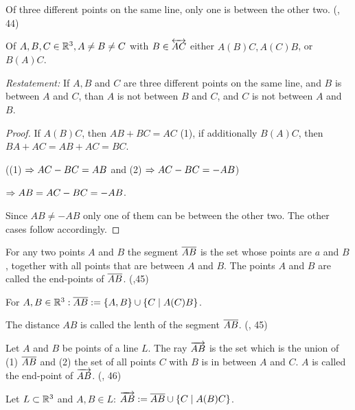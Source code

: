 \begin{theorem}[2-3.]\label{thm:2-3.}
  \leanok
  Of three different points on the same line, only one is between the other two.
  (\cite{SMSGGeometry}, 44)

  Of $A,B,C \in \mathbb{R}^3, A \ne B \ne C$ with $B \in \overleftrightarrow{AC}$ either $A(B)C, A(C)B$, or $B(A)C$.
\end{theorem}
\textit{Restatement:} If $A,B$ and $C$ are three different points on the same line, and $B$ is between $A$ and $C$, than $A$ is not between $B$ and $C$, and $C$ is not between $A$ and $B$.

\begin{proof}
  \leanok
  If $A(B)C$, then $AB+BC=AC$ (1), if additionally $B(A)C$, then $BA+AC=AB+AC=BC$.

  ((1) $\Rightarrow AC-BC=AB$ and (2) $\Rightarrow AC-BC=-AB$)

  $\Rightarrow AB=AC-BC=-AB$.

  Since $AB\ne-AB$ only one of them can be between the other two.
  The other cases follow accordingly.
\end{proof}


\begin{definition}[Segment]\label{def:Segment}
  For any two points $A$ and $B$ the segment $\overline{AB}$ is the set whose points are $a$ and $B$, together with all points that are between $A$ and $B$.
  The points $A$ and $B$ are called the end-points of $\overline{AB}$.
  (\cite{SMSGGeometry},45)

  For $A,B \in \mathbb{R}^3: \overline{AB}:=\left\{ A,B \right\}\cup \left\{ C\mid A(C)B \right\}$.
\end{definition}

\begin{definition}\label{def:Segment_Lenth}
    The distance $AB$ is called the lenth of the segment $\overline{AB}$.
    (\cite{SMSGGeometry}, 45)

\end{definition}

\begin{definition}[Ray]\label{def:Ray}
  Let $A$ and $B$ be points of a line $L$.
  The ray $\overrightarrow{AB}$ is the set which is the union of (1) $\overline{AB}$ and (2) the set of all points $C$ with $B$ is in between $A$ and $C$.
  $A$ is called the end-point of $\overrightarrow{AB}$.
  (\cite{SMSGGeometry}, 46)

  Let $L \subset \mathbb{R}^3$ and $A,B \in L$: $\overrightarrow{AB}:=\overline{AB}\cup \left\{ C\mid A(B)C \right\}$.
\end{definition}

